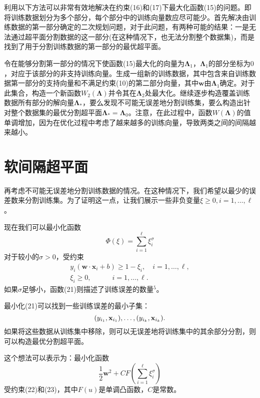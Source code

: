 \documentclass[lang=cn,11pt,a4paper]{elegantpaper}
\begin{document}
	利用以下方法可以非常有效地解决在约束(16)和(17)下最大化函数(15)的问题。即将训练数据划分为多个部分，每个部分中的训练向量数应尽可能少。首先解决由训练数据的第一部分确定的二次规划问题，对于此问题，有两种可能的结果：一是无法通过超平面分割数据的这一部分(在这种情况下，也无法分割整个数据集)，而是找到了用于分割训练数据的第一部分的最优超平面。

	令在能够分割第一部分的情况下使函数(15)最大化的向量为$\mathbf{\Lambda}_1$，$\mathbf{\Lambda}_1$的部分坐标为$0$，对应于该部分的非支持训练向量。生成一组新的训练数据，其中包含来自训练数据第一部分的支持向量和不满足约束(10)的第二部分向量，其中$\mathbf{w}$由$\mathbf{\Lambda}_1$确定。对于此集合，构造一个新函数$W_2(\mathbf{\Lambda})$并令其在$\mathbf{\Lambda}_2$处最大化。继续逐步构造覆盖训练数据所有部分的解向量$\mathbf{\Lambda}_*$，要么发现不可能无误差地分割训练集，要么构造出针对整个数据集的最优分割超平面$\mathbf{\Lambda}_*=\mathbf{\Lambda}_0$。注意，在此过程中，函数$W(\mathbf{\Lambda})$的值单调增加，因为在优化过程中考虑了越来越多的训练向量，导致两类之间的间隔越来越小。

	\section{软间隔超平面}
	再考虑不可能无误差地分割训练数据的情况。在这种情况下，我们希望以最少的误差数来分割训练集。为了证明这一点，让我们展示一些非负变量$\xi\geq0,i=1,\dots,\ell$。

	现在我们可以最小化函数
	\begin{equation}
		\Phi(\xi)=\sum_{i=1}^\ell\xi_i^\sigma\tag{21}
	\end{equation}
	对于较小的$\sigma>0$，受约束
	\begin{align}
		y_i(\mathbf{w}·\mathbf{x}_i+b) \geq 1-\xi_i,\quad i=1,\dots,\ell, \tag{22} \\
		\xi_i \geq 0,\quad \qquad i=1,\dots,\ell.\tag{23}
	\end{align}
	如果$\sigma$足够小，函数(21)则描述了训练误差的数量$^5$。

	最小化(21)可以找到一些训练误差的最小子集：
	\begin{equation}
		(y_{i_1},\mathbf{x}_{i_1}),\dots,(y_{i_k},\mathbf{x}_{i_k}).\notag
	\end{equation}
	如果将这些数据从训练集中移除，则可以无误差地将训练集中的其余部分分割，则可以构造最优分割超平面。

	这个想法可以表示为：最小化函数
	\begin{equation}
		\frac{1}{2}\mathbf{w}^2+CF\left(\sum_{i=1}^{\ell}\xi_i^\sigma\right)\tag{24}
	\end{equation}
	受约束(22)和(23)，其中$F(u)$是单调凸函数，$C$是常数。
\end{document}
